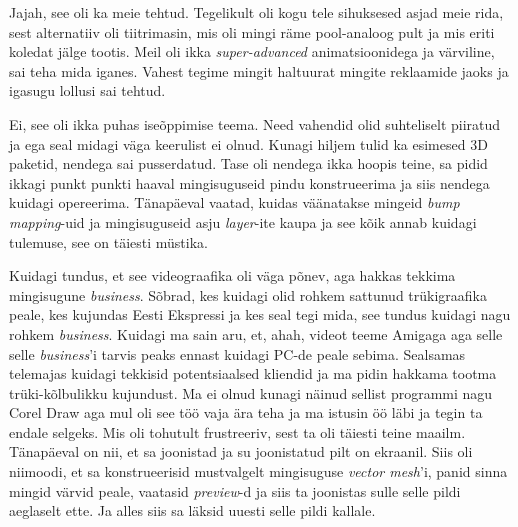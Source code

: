Jajah, see oli ka meie tehtud. Tegelikult oli kogu tele sihuksesed asjad meie rida, sest  alternatiiv oli tiitrimasin, mis oli mingi räme pool-analoog pult ja mis  eriti koledat jälge tootis. Meil oli ikka \emph{super-advanced} animatsioonidega ja värviline, sai teha mida iganes. Vahest tegime mingit haltuurat mingite reklaamide jaoks ja igasugu lollusi sai tehtud.


Ei, see oli ikka puhas iseõppimise teema. Need vahendid olid suhteliselt piiratud ja ega seal midagi väga keerulist ei olnud. Kunagi hiljem tulid ka esimesed 3D paketid, nendega sai pusserdatud. Tase oli nendega ikka hoopis teine, sa pidid ikkagi punkt punkti haaval mingisuguseid pindu konstrueerima ja siis nendega kuidagi opereerima. Tänapäeval vaatad, kuidas väänatakse mingeid \emph{bump mapping}-uid ja mingisuguseid asju \emph{layer}-ite kaupa ja see kõik annab kuidagi tulemuse,  see on täiesti müstika. 


Kuidagi tundus, et see videograafika oli  väga põnev, aga hakkas tekkima mingisugune \emph{business}. Sõbrad, kes kuidagi olid rohkem sattunud trükigraafika peale, kes  kujundas Eesti Ekspressi ja kes seal tegi mida, see tundus kuidagi nagu rohkem \emph{business}. Kuidagi ma sain aru, et, ahah, videot teeme Amigaga aga selle selle \emph{business}'i tarvis peaks ennast kuidagi PC-de peale  sebima. Sealsamas telemajas kuidagi tekkisid potentsiaalsed kliendid ja ma pidin hakkama tootma trüki-kõlbulikku kujundust. Ma ei olnud  kunagi näinud sellist programmi nagu Corel Draw aga mul oli see töö vaja  ära teha ja ma istusin öö läbi ja tegin ta endale selgeks. Mis oli tohutult frustreeriv, sest ta oli täiesti teine maailm. Tänapäeval on nii, et sa joonistad ja su joonistatud pilt on  ekraanil. Siis oli niimoodi, et sa  konstrueerisid mustvalgelt mingisuguse \emph{vector mesh}'i, panid sinna mingid värvid peale, vaatasid \emph{preview}-d ja siis ta joonistas sulle selle pildi aeglaselt ette. Ja alles siis sa läksid uuesti selle pildi kallale.


